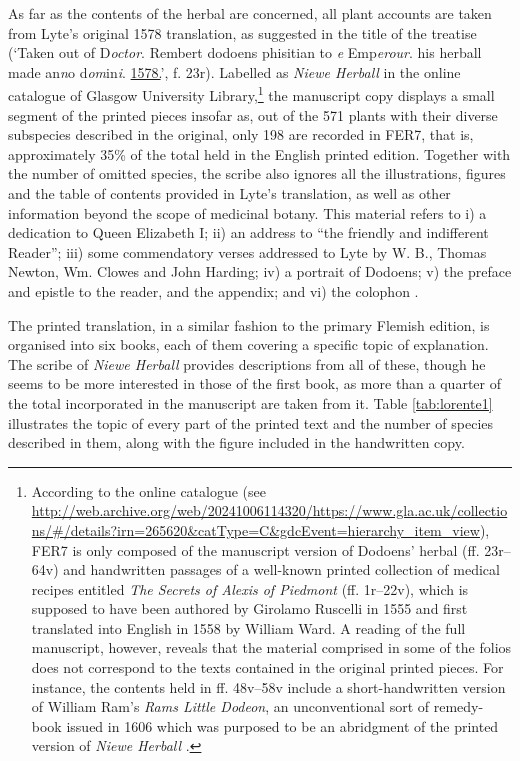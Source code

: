 \begin{paper}
As far as the contents of the herbal are concerned, all plant accounts
are taken from Lyte's original 1578 translation, as suggested in the
title of the treatise (`Taken out of D\emph{octor}. Rembert dodoens
phisitian to \th\emph{e} Emp\emph{erour}. his herball made an\emph{n}o
d\emph{om}in\emph{i}. \uline{1578.}', f. 23r). Labelled as \emph{Niewe
Herball} in the online catalogue of Glasgow University
Library,\footnote{According to the online catalogue
  (see \url{http://web.archive.org/web/20241006114320/https://www.gla.ac.uk/collections/\#/details?irn=265620&catType=C&gdcEvent=hierarchy_item_view}), FER7 is
  only composed of the manuscript version of Dodoens' herbal (ff.
  23r--64v) and handwritten passages of a well-known printed collection
  of medical recipes entitled \emph{The Secrets of Alexis of Piedmont}
  (ff. 1r--22v), which is supposed to have been authored by Girolamo
  Ruscelli in 1555 \citep[see][]{bela_authorship_2016} and first translated into English in
  1558 by William Ward. A reading of the full manuscript, however,
  reveals that the material comprised in some of the folios does not
  correspond to the texts contained in the original printed pieces. For
  instance, the contents held in ff. 48v--58v include a short-handwritten
  version of William Ram's \emph{Rams Little Dodeon}, an unconventional
  sort of remedy-book issued in 1606 which was purposed to be an
  abridgment of the printed version of \emph{Niewe Herball} \citep[see][141]{barlow_old_1913}.} the manuscript copy displays a small segment of the
printed pieces insofar as, out of the 571 plants with their diverse
subspecies described in the original, only 198 are recorded in FER7,
that is, approximately 35\% of the total held in the English printed
edition. Together with the number of omitted species, the scribe also
ignores all the illustrations, figures and the table of contents
provided in Lyte's translation, as well as other information beyond the
scope of medicinal botany. This material refers to i) a dedication to
Queen Elizabeth I; ii) an address to ``the friendly and indifferent
Reader''; iii) some commendatory verses addressed to Lyte by W. B.,
Thomas Newton, Wm. Clowes and John Harding; iv) a portrait of Dodoens;
v) the preface and epistle to the reader, and the appendix; and vi) the
colophon \citealp[see][139]{barlow_old_1913}.

The printed translation, in a similar fashion to the primary Flemish
edition, is organised into six books, each of them covering a specific
topic of explanation. The scribe of \emph{Niewe Herball} provides
descriptions from all of these, though he seems to be more interested in
those of the first book, as more than a quarter of the total
incorporated in the manuscript are taken from it. Table \ref{tab:lorente1} illustrates
the topic of every part of the printed text and the number of species
described in them, along with the figure included in the handwritten
copy.


\end{paper}
